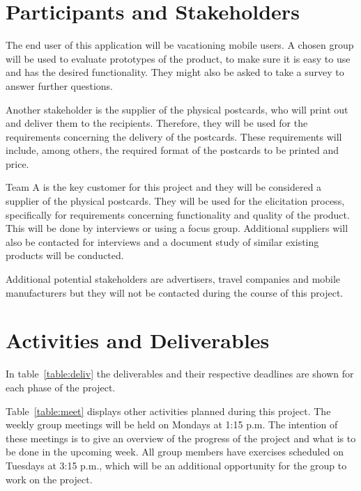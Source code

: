 \documentclass[10pt,a4paper]{article}
\begin{document}
\section{Participants and Stakeholders}

The end user of this application will be vacationing mobile users. A chosen group will be used to evaluate prototypes of the product, to make sure it is easy to use and has the desired functionality. They might also be asked to take a survey to answer further questions.

Another stakeholder is the supplier of the physical postcards, who will print out and deliver them to the recipients. Therefore, they will be used for the requirements concerning the delivery of the postcards. These requirements will include, among others, the required format of the postcards to be printed and price.

Team A is the key customer for this project and they will be considered a supplier of the physical postcards. They will be used for the elicitation process, specifically for requirements concerning functionality and quality of the product. This will be done by interviews or using a focus group. Additional suppliers will also be contacted for interviews and a document study of similar existing products will be conducted. 

Additional potential stakeholders are advertisers, travel companies and mobile manufacturers but they will not be contacted during the course of this project.

\section{Activities and Deliverables}

In table~\ref{table:deliv} the deliverables and their respective deadlines are shown for each phase of the project. 

Table~\ref{table:meet} displays other activities planned during this project. The weekly group meetings will be held on Mondays at 1:15 p.m. The intention of these meetings is to give an overview of the progress of the project and what is to be done in the upcoming week. All group members have exercises scheduled on Tuesdays at 3:15 p.m., which will be an additional opportunity for the group to work on the project. 
\end{document}
